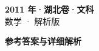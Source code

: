 \documentclass[zihao=-4, a4paper]{ctexart}
\begin{document}
\begin{center}
  {\Large\bfseries 2011 年·湖北卷·文科}\\[4pt]
  {\large 数学 · 解析版}
\end{center}
\medskip
{}

\clearpage
{}
\begin{center}{\Large\bfseries 参考答案与详细解析}\end{center}
\medskip

\end{document}
